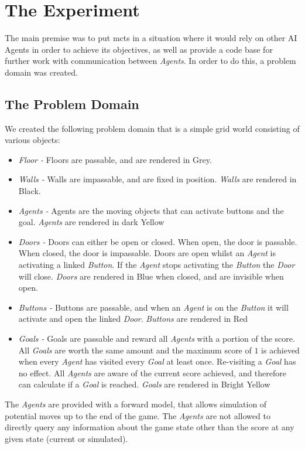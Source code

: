 \documentclass{IEEEtran}
\begin{document}
\section{The Experiment}
The main premise was to put \gls{mcts} in a situation where it would rely on other AI Agents in order to achieve its objectives, as well as provide a code base for further work with communication between \emph{Agents}. In order to do this, a problem domain was created.
\subsection{The Problem Domain}
We created the following problem domain that is a simple grid world consisting of various objects:
\begin{itemize}
\item{\emph{Floor - } Floors are passable, and are rendered in Grey.}
\item{\emph{Walls -} Walls are impassable, and are fixed in position. \emph{Walls} are rendered in Black.}
\item{\emph{Agents -} Agents are the moving objects that can activate buttons and the goal. \emph{Agents} are rendered in dark Yellow}
\item{\emph{Doors -} Doors can either be open or closed. When open, the door is passable. When closed, the door is impassable. Doors are open whilst an \emph{Agent} is activating a linked \emph{Button}. If the \emph{Agent} stops activating the \emph{Button} the \emph{Door} will close. \emph{Doors} are rendered in Blue when closed, and are invisible when open.}
\item{\emph{Buttons -} Buttons are passable, and when an \emph{Agent} is on the \emph{Button} it will activate and open the linked \emph{Door}. \emph{Buttons} are rendered in Red}
\item{\emph{Goals -} Goals are passable and reward all \emph{Agents} with a portion of the score. All \emph{Goals} are worth the same amount and the maximum score of $1$ is achieved when every \emph{Agent} has visited every \emph{Goal} at least once. Re-visiting a \emph{Goal} has no effect. All \emph{Agents} are aware of the current score achieved, and therefore can calculate if a \emph{Goal} is reached. \emph{Goals} are rendered in Bright Yellow}
\end{itemize}

The \emph{Agents} are provided with a forward model, that allows simulation of potential moves up to the end of the game. The \emph{Agents} are not allowed to directly query any information about the game state other than the score at any given state (current or simulated).
\end{document}
